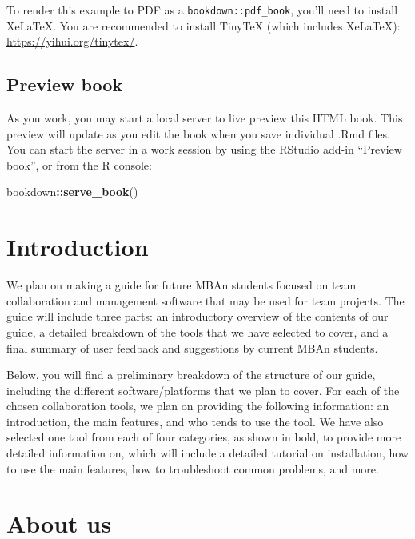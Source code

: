 \documentclass[
]{book}
\newenvironment{Shaded}{\begin{snugshade}}{\end{snugshade}}
\newcommand{\KeywordTok}[1]{\textcolor[rgb]{0.13,0.29,0.53}{\textbf{#1}}}
\newcommand{\NormalTok}[1]{#1}
\newcommand{\OperatorTok}[1]{\textcolor[rgb]{0.81,0.36,0.00}{\textbf{#1}}}
\begin{document}
To render this example to PDF as a \texttt{bookdown::pdf\_book}, you'll need to install XeLaTeX. You are recommended to install TinyTeX (which includes XeLaTeX): \url{https://yihui.org/tinytex/}.

\hypertarget{preview-book}{%
\section{Preview book}\label{preview-book}}

As you work, you may start a local server to live preview this HTML book. This preview will update as you edit the book when you save individual .Rmd files. You can start the server in a work session by using the RStudio add-in ``Preview book'', or from the R console:

\begin{Shaded}
\begin{Highlighting}[]
\NormalTok{bookdown}\OperatorTok{::}\KeywordTok{serve_book}\NormalTok{()}
\end{Highlighting}
\end{Shaded}

\hypertarget{introduction}{%
\chapter{Introduction}\label{introduction}}

We plan on making a guide for future MBAn students focused on team collaboration and management software that may be used for team projects. The guide will include three parts: an introductory overview of the contents of our guide, a detailed breakdown of the tools that we have selected to cover, and a final summary of user feedback and suggestions by current MBAn students.

Below, you will find a preliminary breakdown of the structure of our guide, including the different software/platforms that we plan to cover. For each of the chosen collaboration tools, we plan on providing the following information: an introduction, the main features, and who tends to use the tool. We have also selected one tool from each of four categories, as shown in bold, to provide more detailed information on, which will include a detailed tutorial on installation, how to use the main features, how to troubleshoot common problems, and more.

\hypertarget{about-us}{%
\chapter{About us}\label{about-us}}
\end{document}
